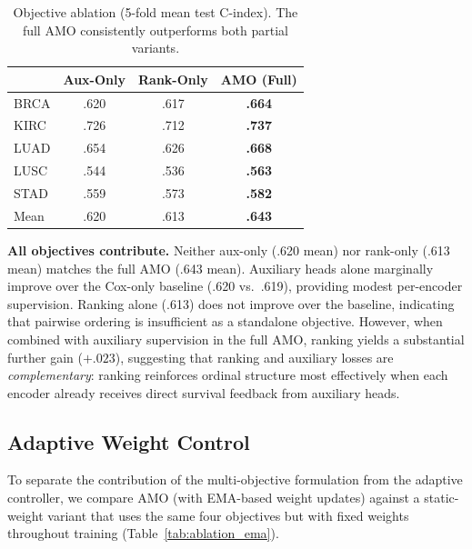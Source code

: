 \documentclass[10pt,twocolumn,letterpaper]{article}
\begin{document}
\begin{table}[t]
\centering
\caption{Objective ablation (5-fold mean test C-index).
The full AMO consistently outperforms both partial variants.}
\label{tab:ablation_obj}
\begin{tabular}{lccc}
\toprule
& Aux-Only & Rank-Only & AMO (Full) \\
\midrule
BRCA & .620 & .617 & \textbf{.664} \\
KIRC & .726 & .712 & \textbf{.737} \\
LUAD & .654 & .626 & \textbf{.668} \\
LUSC & .544 & .536 & \textbf{.563} \\
STAD & .559 & .573 & \textbf{.582} \\
\midrule
Mean & .620 & .613 & \textbf{.643} \\
\bottomrule
\end{tabular}
\end{table}

\textbf{All objectives contribute.} Neither aux-only (.620 mean)
nor rank-only (.613 mean) matches the full AMO (.643 mean).
Auxiliary heads alone marginally improve over the Cox-only baseline
(.620 vs.\ .619), providing modest per-encoder supervision.
Ranking alone (.613) does not improve over the baseline,
indicating that pairwise ordering is insufficient as a standalone
objective. However, when combined with auxiliary supervision in the
full AMO, ranking yields a substantial further gain ($+.023$),
suggesting that ranking and auxiliary losses are
\textit{complementary}: ranking reinforces ordinal structure most
effectively when each encoder already receives direct survival
feedback from auxiliary heads.

\subsection{Adaptive Weight Control}
\label{sec:ema_ablation}

To separate the contribution of the multi-objective formulation from
the adaptive controller, we compare AMO (with EMA-based weight
updates) against a static-weight variant that uses the same four
objectives but with fixed weights throughout training
(Table~\ref{tab:ablation_ema}).
\end{document}
